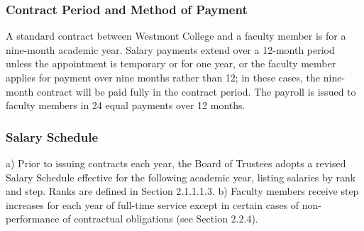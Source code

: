 \documentclass[letterpaper, 11pt]{article}
\begin{document}
		\subsubsection{Contract Period and Method of Payment}
			A standard contract between Westmont College and a faculty member is for a nine-month academic year.  Salary payments extend over a 12-month period unless the appointment is temporary or for one year, or the faculty member applies for payment over nine months rather than 12; in these cases, the nine-month contract will be paid fully in the contract period.  The payroll is issued to faculty members in 24 equal payments over 12 months.
		\subsubsection{Salary Schedule}
			a) Prior to issuing contracts each year, the Board of Trustees adopts a revised Salary Schedule effective for the following academic year, listing salaries by rank and step.  Ranks are defined in Section 2.1.1.1.3.
			b) Faculty members receive step increases for each year of full-time service except in certain cases of non-performance of contractual obligations (see Section 2.2.4).
\end{document}
